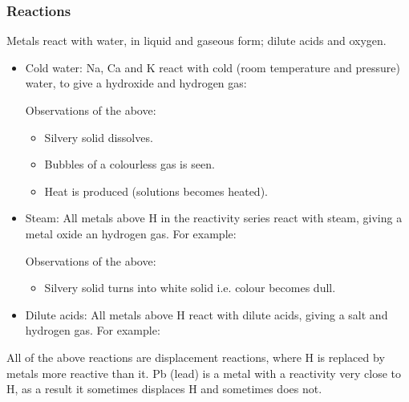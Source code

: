 \documentclass{article}
\begin{document}
\subsubsection*{Reactions}
Metals react with water, in liquid and gaseous form; dilute acids and oxygen.
\begin{itemize}
	\item Cold water: Na, Ca and K react with cold (room temperature and pressure)
		water, to give a hydroxide and hydrogen gas:




		Observations of the above:
		\begin{itemize}
			\item Silvery solid dissolves.
			\item Bubbles of a colourless gas is seen.
			\item Heat is produced (solutions becomes heated).
		\end{itemize}
	\item Steam: All metals above H in the reactivity series react with steam, giving
		a metal oxide an hydrogen gas. For example:


		Observations of the above:
		\begin{itemize}
			\item Silvery solid turns into white solid i.e. colour becomes dull.
		\end{itemize}
	\item Dilute acids: All metals above H react with dilute acids, giving a salt and
		hydrogen gas. For example:

\end{itemize}
All of the above reactions are displacement reactions, where H is replaced by metals
more reactive than it. Pb (lead) is a metal with a reactivity very close to H, as a 
result it sometimes displaces H and sometimes does not.
\end{document}
